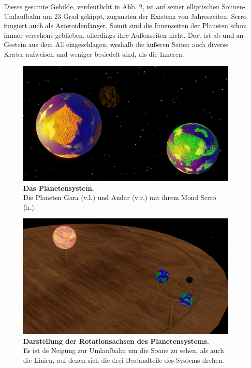 Dieses gesamte Gebilde, verdeutlicht in Abb. \ref{fig:planeten-konzept}, ist auf seiner elliptischen Sonnen-Umlaufbahn um 23 Grad gekippt, zugunsten der Existenz von Jahreszeiten.
Serro fungiert auch als Asteroidenfänger.
Somit sind die Innenseiten der Planeten schon immer verschont geblieben, allerdings ihre Außenseiten nicht.
Dort ist ab und an Gestein aus dem All eingeschlagen, weshalb die äußeren Seiten auch diverse Krater aufweisen und weniger besiedelt sind, als die Inneren.

\begin{figure}[tbh]
	\centering
	\includegraphics[width=0.9\linewidth]{Abbildungen/Weltenbau/Welt/planeten-system}
	\caption[Das Planetensystem]{\textbf{Das Planetensystem.}\\
	Die Planeten Gara (v.l.) und Andar (v.r.) mit ihrem Mond Serro (h.).}
	\label{fig:planeten-system}
\end{figure}

\begin{figure}[tbh]
	\centering
	\includegraphics[width=0.9\linewidth]{Abbildungen/Weltenbau/Welt/planeten-konzept}
	\caption[Konzept des Planetensystems]{\textbf{Darstellung der Rotationsachsen des Planetensystems.}\\
	Es ist de Neigung zur Umlaufbahn um die Sonne zu sehen, als auch die Linien, auf denen sich die drei Bestandteile des Systems drehen.}
	\label{fig:planeten-konzept}
\end{figure}


